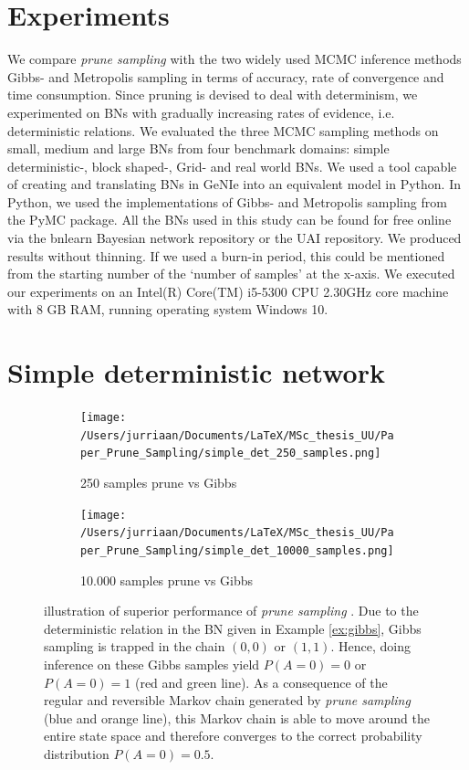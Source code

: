 \documentclass[a4paper, twoside, 11pt]{report}
\theoremstyle{plain}
\theoremstyle{definition}
\theoremstyle{remark}
\newcommand{\ps}{\textit{prune sampling }}
\begin{document}
\section{Experiments}
We compare \ps with the two widely used MCMC inference methods Gibbs- and Metropolis sampling in terms of accuracy, rate of convergence and time consumption. Since pruning is devised to deal with determinism, we experimented on BNs with gradually increasing rates of evidence, i.e. deterministic relations. We evaluated the three MCMC sampling methods on small, medium and large BNs from four benchmark domains: simple deterministic-, block shaped-, Grid- and real world BNs. We used a tool capable of creating and translating BNs in GeNIe into an equivalent model in Python. In Python, we used the implementations of Gibbs- and Metropolis sampling from the PyMC package. All the BNs used in this study can be found for free online via the bnlearn Bayesian network repository or the UAI repository. We produced results without thinning. If we used a burn-in period, this could be mentioned from the starting number of the `number of samples' at the x-axis. We executed our experiments on an Intel(R) Core(TM) i5-5300 CPU 2.30GHz core machine with 8 GB RAM, running operating system Windows 10.

\section{Simple deterministic network}

\begin{figure}[h]
\centering
\begin{subfigure}{.49\textwidth}
  \centering
  \texttt{[image: /Users/jurriaan/Documents/LaTeX/MSc\_thesis\_UU/Paper\_Prune\_Sampling/simple\_det\_250\_samples.png]}
  \caption{250 samples prune vs Gibbs}
  \label{fig:sub1}
\end{subfigure}
\begin{subfigure}{.49\textwidth}
  \centering
  \texttt{[image: /Users/jurriaan/Documents/LaTeX/MSc\_thesis\_UU/Paper\_Prune\_Sampling/simple\_det\_10000\_samples.png]}
  \caption{10.000 samples prune vs Gibbs}
  \label{fig:sub2}
\end{subfigure}
\caption{illustration of superior performance of \ps. Due to the deterministic relation in the BN given in Example \ref{ex:gibbs}, Gibbs sampling is trapped in the chain $(0,0)$ or $(1,1)$. Hence, doing inference on these Gibbs samples yield $P(A = 0)=0$ or $P(A = 0)=1$ (red and green line). As a consequence of the regular and reversible Markov chain generated by \ps (blue and orange line), this Markov chain is able to move around the entire state space and therefore converges to the correct probability distribution $P(A = 0) = 0.5$.}
\label{simple-deterministic}
\end{figure}
\end{document}
